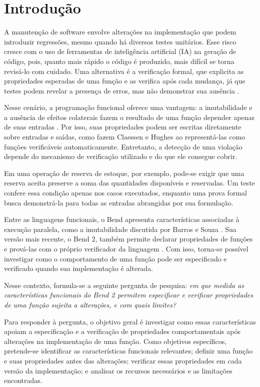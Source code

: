 \section{Introdução}
\label{sect:intro}

A manutenção de software envolve alterações na implementação que podem introduzir regressões, mesmo quando há diversos testes unitários. Esse risco cresce com o uso de ferramentas de inteligência artificial (IA) na geração de código, pois, quanto mais rápido o código é produzido, mais difícil se torna revisá-lo com cuidado. Uma alternativa é a verificação formal, que explicita as propriedades esperadas de uma função e as verifica após cada mudança, já que testes podem revelar a presença de erros, mas não demonstrar sua ausência \cite{Dijkstra1972}.

Nesse cenário, a programação funcional oferece uma vantagem: a imutabilidade e a ausência de efeitos colaterais fazem o resultado de uma função depender apenas de suas entradas \cite{Hughes1989}. Por isso, suas propriedades podem ser escritas diretamente sobre entradas e saídas, como fazem Claessen e Hughes \cite{ClaessenHughes2000} ao representá-las como funções verificáveis automaticamente. Entretanto, a detecção de uma violação depende do mecanismo de verificação utilizado e do que ele consegue cobrir.

Em uma operação de reserva de estoque, por exemplo, pode-se exigir que uma reserva aceita preserve a soma das quantidades disponíveis e reservadas. Um teste confere essa condição apenas nos casos executados, enquanto uma prova formal busca demonstrá-la para todas as entradas abrangidas por sua formulação.

Entre as linguagens funcionais, o Bend apresenta características associadas à execução paralela, como a imutabilidade discutida por Barros e Souza \cite{BarrosSouza2025}. Sua versão mais recente, o Bend 2, também permite declarar propriedades de funções e prová-las com o próprio verificador da linguagem \cite{BendGuide}. Com isso, torna-se possível investigar como o comportamento de uma função pode ser especificado e verificado quando sua implementação é alterada.

Nesse contexto, formula-se a seguinte pergunta de pesquisa: \textit{em que medida as características funcionais do Bend 2 permitem especificar e verificar propriedades de uma função sujeita a alterações, e com quais limites?}

Para responder à pergunta, o objetivo geral é investigar como essas características apoiam a especificação e a verificação de propriedades comportamentais após alterações na implementação de uma função. Como objetivos específicos, pretende-se identificar as características funcionais relevantes; definir uma função e suas propriedades antes das alterações; verificar essas propriedades em cada versão da implementação; e analisar os recursos necessários e as limitações encontradas.

